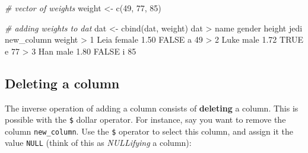 \documentclass[
]{book}
\newenvironment{Shaded}{\begin{snugshade}}{\end{snugshade}}
\newcommand{\CommentTok}[1]{\textcolor[rgb]{0.56,0.35,0.01}{\textit{#1}}}
\newcommand{\ConstantTok}[1]{\textcolor[rgb]{0.00,0.00,0.00}{#1}}
\newcommand{\DecValTok}[1]{\textcolor[rgb]{0.00,0.00,0.81}{#1}}
\newcommand{\FloatTok}[1]{\textcolor[rgb]{0.00,0.00,0.81}{#1}}
\newcommand{\FunctionTok}[1]{\textcolor[rgb]{0.00,0.00,0.00}{#1}}
\newcommand{\NormalTok}[1]{#1}
\newcommand{\OtherTok}[1]{\textcolor[rgb]{0.56,0.35,0.01}{#1}}
\newcommand{\SpecialCharTok}[1]{\textcolor[rgb]{0.00,0.00,0.00}{#1}}
\begin{document}
\begin{Shaded}
\begin{Highlighting}[]
\CommentTok{\# vector of weights}
\NormalTok{weight }\OtherTok{\textless{}{-}} \FunctionTok{c}\NormalTok{(}\DecValTok{49}\NormalTok{, }\DecValTok{77}\NormalTok{, }\DecValTok{85}\NormalTok{)}

\CommentTok{\# adding weights to dat}
\NormalTok{dat }\OtherTok{\textless{}{-}} \FunctionTok{cbind}\NormalTok{(dat, weight)}
\NormalTok{dat}
\SpecialCharTok{\textgreater{}}\NormalTok{   name gender height  jedi new\_column weight}
\SpecialCharTok{\textgreater{}} \DecValTok{1}\NormalTok{ Leia female   }\FloatTok{1.50} \ConstantTok{FALSE}\NormalTok{          a     }\DecValTok{49}
\SpecialCharTok{\textgreater{}} \DecValTok{2}\NormalTok{ Luke   male   }\FloatTok{1.72}  \ConstantTok{TRUE}\NormalTok{          e     }\DecValTok{77}
\SpecialCharTok{\textgreater{}} \DecValTok{3}\NormalTok{  Han   male   }\FloatTok{1.80} \ConstantTok{FALSE}\NormalTok{          i     }\DecValTok{85}
\end{Highlighting}
\end{Shaded}

\hypertarget{deleting-a-column-1}{%
\subsection{Deleting a column}\label{deleting-a-column-1}}

The inverse operation of adding a column consists of \textbf{deleting} a column.
This is possible with the \texttt{\$} dollar operator. For instance, say you want to
remove the column \texttt{new\_column}. Use the \texttt{\$} operator to select this column,
and assign it the value \texttt{NULL} (think of this as \emph{NULLifying} a column):

\begin{Shaded}
\end{Shaded}
\end{document}
